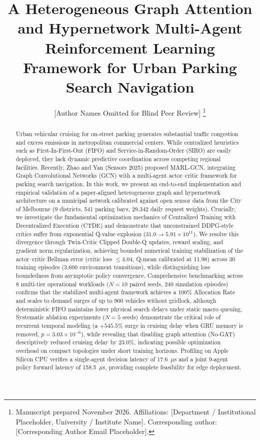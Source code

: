 \documentclass[journal]{IEEEtran}
\begin{document}
\title{A Heterogeneous Graph Attention and Hypernetwork Multi-Agent Reinforcement Learning Framework for Urban Parking Search Navigation}

\author{[Author Names Omitted for Blind Peer Review]%
\thanks{Manuscript prepared November 2026. Affiliations: [Department / Institutional Placeholder, University / Institute Name]. Corresponding author: [Corresponding Author Email Placeholder].}}

\maketitle

\begin{abstract}
Urban vehicular cruising for on-street parking generates substantial traffic congestion and excess emissions in metropolitan commercial centers. While centralized heuristics such as First-In-First-Out (FIFO) and Service-in-Random-Order (SIRO) are easily deployed, they lack dynamic predictive coordination across competing regional facilities. Recently, Zhao and Yan (Sensors 2025) proposed MARL-GCN, integrating Graph Convolutional Networks (GCN) with a multi-agent actor--critic framework for parking search navigation. In this work, we present an end-to-end implementation and empirical validation of a paper-aligned heterogeneous graph and hypernetwork architecture on a municipal network calibrated against open sensor data from the City of Melbourne (9 districts, 541 parking bays, 29,342 daily request weights). Crucially, we investigate the fundamental optimization mechanics of Centralized Training with Decentralized Execution (CTDE) and demonstrate that unconstrained DDPG-style critics suffer from exponential Q-value explosion ($31.0 \to 5.91 \times 10^{11}$). We resolve this divergence through Twin-Critic Clipped Double-Q updates, reward scaling, and gradient norm regularization, achieving bounded numerical training stabilization of the actor--critic Bellman error (critic loss $\le 4.04$, Q-mean calibrated at 11.98) across 30 training episodes (3,600 environment transitions), while distinguishing loss boundedness from asymptotic policy convergence. Comprehensive benchmarking across 8 multi-tier operational workloads ($N=10$ paired seeds, 240 simulation episodes) confirms that the stabilized multi-agent framework achieves a 100\% Allocation Rate and scales to demand surges of up to 900 vehicles without gridlock, although deterministic FIFO maintains lower physical search delays under static macro queuing. Systematic ablation experiments ($N=5$ seeds) demonstrate the critical role of recurrent temporal modeling (a $+545.5\%$ surge in cruising delay when GRU memory is removed, $p = 3.03 \times 10^{-6}$), while revealing that disabling graph attention (No-GAT) descriptively reduced cruising delay by 23.0\%, indicating possible optimization overhead on compact topologies under short training horizons. Profiling on Apple Silicon CPU verifies a single-agent decision latency of 17.6~$\mu$s and a joint 9-agent policy forward latency of 158.5~$\mu$s, providing complete feasibility for edge deployment.
\end{abstract}
\end{document}
